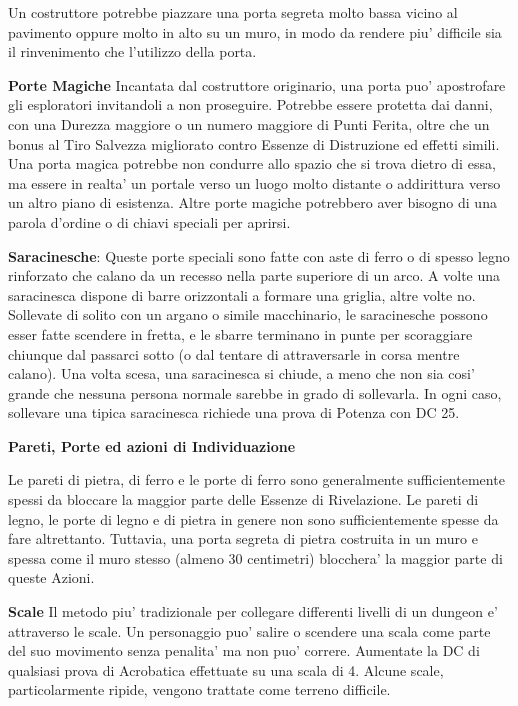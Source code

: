 \documentclass[a4paper,11pt,twoside,openany]{book}
\begin{document}
{		Un costruttore potrebbe piazzare una porta segreta molto bassa vicino al pavimento oppure molto in alto su un muro, in modo da rendere piu' difficile sia il rinvenimento che l'utilizzo della porta.
		
		\textbf{Porte Magiche} Incantata dal costruttore originario, una porta puo' apostrofare gli esploratori invitandoli a non proseguire. Potrebbe essere protetta dai danni, con una Durezza maggiore o un numero maggiore di Punti Ferita, oltre che un bonus al Tiro Salvezza migliorato contro Essenze di Distruzione ed effetti simili. Una porta magica potrebbe non condurre allo spazio che si trova dietro di essa, ma essere in realta' un portale verso un luogo molto distante o addirittura verso un altro piano di esistenza. Altre porte magiche potrebbero aver bisogno di una parola d'ordine o di chiavi speciali per aprirsi.
		
		\textbf{Saracinesche}: Queste porte speciali sono fatte con aste di ferro o di spesso legno rinforzato che calano da un recesso nella parte superiore di un arco. A volte una saracinesca dispone di barre orizzontali a formare una griglia, altre volte no. Sollevate di solito con un argano o simile macchinario, le saracinesche possono esser fatte scendere in fretta, e le sbarre terminano in punte per scoraggiare chiunque dal passarci sotto (o dal tentare di attraversarle in corsa mentre calano). Una volta scesa, una saracinesca si chiude, a meno che non sia cosi' grande che nessuna persona normale sarebbe in grado di sollevarla. In ogni caso, sollevare una tipica saracinesca richiede una prova di Potenza con DC 25.
		
		\textbf{Pareti, Porte ed azioni di Individuazione}
		
		Le pareti di pietra, di ferro e le porte di ferro sono generalmente sufficientemente spessi da bloccare la maggior parte delle Essenze di Rivelazione. Le pareti di legno, le porte di legno e di pietra in genere non sono sufficientemente spesse da fare altrettanto. Tuttavia, una porta segreta di pietra costruita in un muro e spessa come il muro stesso (almeno 30 centimetri) blocchera' la maggior parte di queste Azioni.
		
		\textbf{Scale} Il metodo piu' tradizionale per collegare differenti livelli di un dungeon e' attraverso le scale. Un personaggio puo' salire o scendere una scala come parte del suo movimento senza penalita' ma non puo' correre. Aumentate la DC di qualsiasi prova di Acrobatica effettuate su una scala di 4. Alcune scale, particolarmente ripide, vengono trattate come terreno difficile.
		
}
\end{document}
